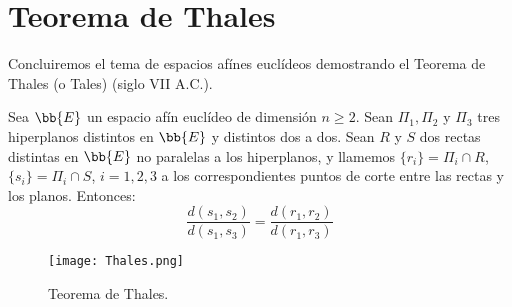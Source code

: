 \section{Teorema de Thales}
Concluiremos el tema de espacios afínes euclídeos demostrando el Teorema de Thales (o Tales) (siglo VII A.C.).
\begin{teo}[Thales]

    Sea $\bb{E}$ un espacio afín euclídeo de dimensión $n\geq 2$. Sean $\Pi_1,\Pi_2$ y $\Pi_3$ tres hiperplanos distintos en $\bb{E}$ y distintos dos a dos. Sean $R$ y $S$ dos rectas distintas en $\bb{E}$ no paralelas a los hiperplanos, y llamemos $\{r_i\}=\Pi_i\cap R$, $\{s_i\}=\Pi_i\cap S$, $i=1,2,3$ a los correspondientes puntos de corte entre las rectas y los planos. Entonces:
    \begin{equation*}
        \frac{d(s_1, s_2)}{d(s_1,s_3)} = \frac{d(r_1,r_2)}{d(r_1,r_3)}
    \end{equation*}

    \begin{figure}[H]
        \centering
        \texttt{[image: Thales.png]}
        \caption{Teorema de Thales.}
    \end{figure}
\end{teo}

